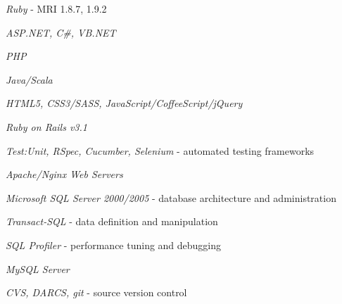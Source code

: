  {
    \textit {Ruby} - MRI 1.8.7, 1.9.2

    \textit {ASP.NET, C\#, VB.NET}

    \textit {PHP}

    \textit {Java/Scala}
}


 {
    \textit {HTML5, CSS3/SASS, JavaScript/CoffeeScript/jQuery}

    \textit {Ruby on Rails v3.1}

    \textit {Test:Unit, RSpec, Cucumber, Selenium} - automated testing frameworks

    \textit {Apache/Nginx Web Servers}
}


 {
    \textit {Microsoft SQL Server 2000/2005} - database architecture and administration

    \textit {Transact-SQL} - data definition and manipulation

    \textit {SQL Profiler} - performance tuning and debugging

    \textit {MySQL Server}

    \textit {CVS, DARCS, git} - source version control
}

